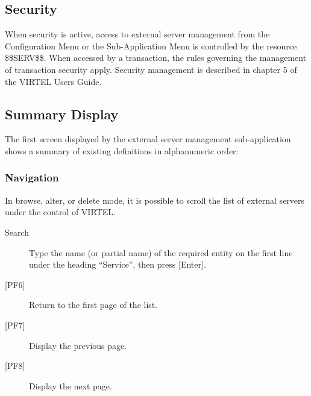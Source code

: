 \documentclass[letterpaper,10pt,english]{sphinxmanual}
\begin{document}
\subsection{Security}
\label{\detokenize{connectivity_guide:index-131}}\label{\detokenize{connectivity_guide:id67}}
When security is active, access to external server management from the Configuration Menu or the Sub-Application Menu is controlled by the resource \$\$SERV\$\$.
When accessed by a transaction, the rules governing the management of transaction security apply.
Security management is described in chapter 5 of the VIRTEL Users Guide.

\ignorespaces 

\subsection{Summary Display}
\label{\detokenize{connectivity_guide:index-132}}\label{\detokenize{connectivity_guide:id68}}
The first screen displayed by the external server management sub-application shows a summary of existing definitions in alphanumeric order:



\subsubsection{Navigation}
\label{\detokenize{connectivity_guide:id69}}
In browse, alter, or delete mode, it is possible to scroll the list of external servers under the control of VIRTEL.
\begin{description}
\item[{Search}] \leavevmode
Type the name (or partial name) of the required entity on the first line under the heading “Service”, then press {[}Enter{]}.

\item[{{[}PF6{]}}] \leavevmode
Return to the first page of the list.

\item[{{[}PF7{]}}] \leavevmode
Display the previous page.

\item[{{[}PF8{]}}] \leavevmode
Display the next page.

\end{description}
\end{document}
